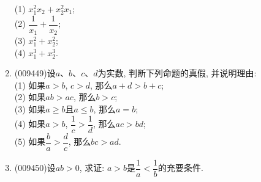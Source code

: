 \documentclass[10pt,a4paper]{article}
\begin{document}
\begin{enumerate}[1.]
(1) $x_1^2x_2+x_2^2x_1$;\\
(2) $\dfrac1{x_1}+\dfrac1{x_2}$;\\
(3) $x_1^2+x_2^2$;\\
(4) $x_1^3+x_2^3$.
\item {\tiny (009449)}设$a$、$b$、$c$、$d$为实数, 判断下列命题的真假, 并说明理由:\\
(1) 如果$a>b$, $c>d$, 那么$a+d>b+c$;\\
(2) 如果$ab>ac$, 那么$b>c$;\\
(3) 如果$a\ge b$且$a\le b$, 那么$a=b$;\\
(4) 如果$a>b$, $\dfrac 1c>\dfrac 1d$, 那么$ac>bd$;\\
(5) 如果$\dfrac ba>\dfrac dc$, 那么$bc>ad$.
\item {\tiny (009450)}设$ab>0$, 求证: $a>b$是$\dfrac 1a<\dfrac 1b$的充要条件.
\end{enumerate}
\end{document}
